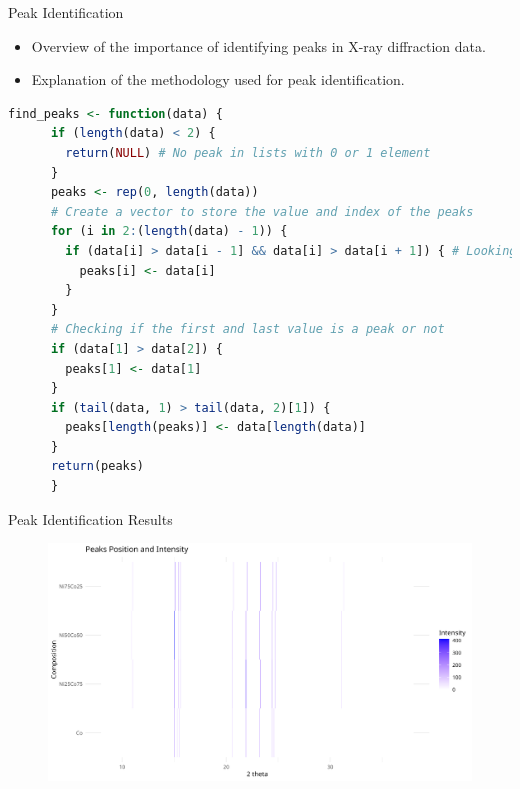 \documentclass[aspectratio=169]{beamer}
\begin{document}
\begin{frame}[fragile]{Peak Identification}
    \begin{itemize}
        \item Overview of the importance of identifying peaks in X-ray diffraction data.
        \item Explanation of the methodology used for peak identification.
    \end{itemize}

    \begin{lstlisting}[language=R, basicstyle=\tiny\ttfamily]
    find_peaks <- function(data) {
      if (length(data) < 2) {
        return(NULL) # No peak in lists with 0 or 1 element
      }
      peaks <- rep(0, length(data))
      # Create a vector to store the value and index of the peaks
      for (i in 2:(length(data) - 1)) {
        if (data[i] > data[i - 1] && data[i] > data[i + 1]) { # Looking for a peak
          peaks[i] <- data[i]
        }
      }
      # Checking if the first and last value is a peak or not
      if (data[1] > data[2]) {
        peaks[1] <- data[1]
      }
      if (tail(data, 1) > tail(data, 2)[1]) {
        peaks[length(peaks)] <- data[length(data)]
      }
      return(peaks)
      }    \end{lstlisting}
\end{frame}

\begin{frame}{Peak Identification Results}
    \begin{figure}
        \includegraphics[width=1\textwidth]{../plot/peaks.png}
    \end{figure}
\end{frame}
\end{document}
